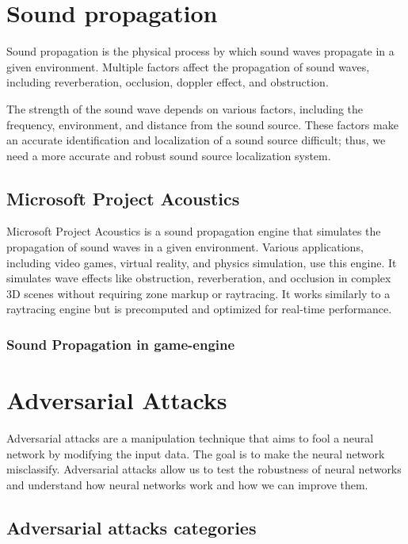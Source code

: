 \section{Sound propagation}
Sound propagation is the physical process by which sound waves propagate in a given environment. Multiple factors affect the propagation of sound waves, including reverberation, occlusion, doppler effect, and obstruction.


The strength of the sound wave depends on various factors, including the frequency, environment, and distance from the sound source. These factors make an accurate identification and localization of a sound source difficult; thus, we need a more accurate and robust sound source localization system.

\subsection{Microsoft Project Acoustics}

Microsoft Project Acoustics is a sound propagation engine that simulates the propagation of sound waves in a given environment. Various applications, including video games, virtual reality, and physics simulation, use this engine. It simulates wave effects like obstruction, reverberation, and occlusion in complex 3D scenes without requiring zone markup or raytracing. It works similarly to a raytracing engine but is precomputed and optimized for real-time performance. 

\subsubsection{Sound Propagation in game-engine}

\section{Adversarial Attacks}

Adversarial attacks are a manipulation technique that aims to fool a neural network by modifying the input data. The goal is to make the neural network misclassify. Adversarial attacks allow us to test the robustness of neural networks and understand how neural networks work and how we can improve them.

\subsection{Adversarial attacks categories}

